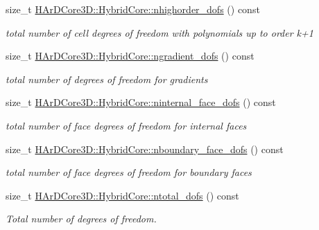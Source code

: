 \begin{DoxyCompactItemize}
\mbox{\label{group__HybridCore_ga07b815b769bba05753666f6bf900fdc5}} 
size\+\_\+t \hyperlink{group__HybridCore_ga07b815b769bba05753666f6bf900fdc5}{H\+Ar\+D\+Core3\+D\+::\+Hybrid\+Core\+::nhighorder\+\_\+dofs} () const
\begin{DoxyCompactList}\small\item\em total number of cell degrees of freedom with polynomials up to order k+1 \end{DoxyCompactList}\item 
\mbox{\label{group__HybridCore_ga3b0fe217b02f8b2c132f6917e2ac9900}} 
size\+\_\+t \hyperlink{group__HybridCore_ga3b0fe217b02f8b2c132f6917e2ac9900}{H\+Ar\+D\+Core3\+D\+::\+Hybrid\+Core\+::ngradient\+\_\+dofs} () const
\begin{DoxyCompactList}\small\item\em total number of degrees of freedom for gradients \end{DoxyCompactList}\item 
\mbox{\label{group__HybridCore_gaffef0ee3517c408e3d086956feb022bd}} 
size\+\_\+t \hyperlink{group__HybridCore_gaffef0ee3517c408e3d086956feb022bd}{H\+Ar\+D\+Core3\+D\+::\+Hybrid\+Core\+::ninternal\+\_\+face\+\_\+dofs} () const
\begin{DoxyCompactList}\small\item\em total number of face degrees of freedom for internal faces \end{DoxyCompactList}\item 
\mbox{\label{group__HybridCore_gaddeb59cc8b5d89525e27b2dee22eb70f}} 
size\+\_\+t \hyperlink{group__HybridCore_gaddeb59cc8b5d89525e27b2dee22eb70f}{H\+Ar\+D\+Core3\+D\+::\+Hybrid\+Core\+::nboundary\+\_\+face\+\_\+dofs} () const
\begin{DoxyCompactList}\small\item\em total number of face degrees of freedom for boundary faces \end{DoxyCompactList}\item 
\mbox{\label{group__HybridCore_ga804722e06e20a32477cd1ae41ee6f473}} 
size\+\_\+t \hyperlink{group__HybridCore_ga804722e06e20a32477cd1ae41ee6f473}{H\+Ar\+D\+Core3\+D\+::\+Hybrid\+Core\+::ntotal\+\_\+dofs} () const
\begin{DoxyCompactList}\small\item\em Total number of degrees of freedom. \end{DoxyCompactList}\item 

\end{DoxyCompactItemize}
